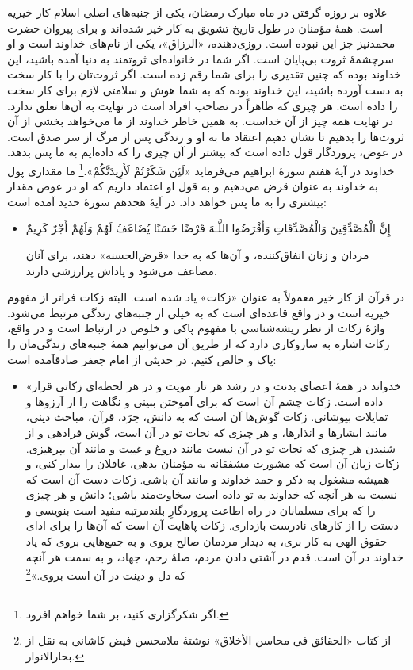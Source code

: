علاوه بر روزه گرفتن در ماه مبارک رمضان، یکی از جنبه‌های اصلی اسلام کار خیریه است. همهٔ‌ مؤمنان در طول تاریخ تشویق به کار خیر شده‌اند و برای پیروان حضرت محمد{}نیز جز این نبوده است. روزی‌دهنده، «الرزاق»، یکی از نام‌های خداوند است و  او سرچشمهٔ ثروت بی‌پایان است. اگر شما در خانواده‌ای ثروتمند به دنیا آمده باشید، این خداوند بوده که چنین تقدیری را برای شما رقم زده است. اگر ثروت‌تان را با کار سخت به دست آورده باشید، این خداوند بوده که به شما هوش و سلامتی لازم برای کار سخت را داده است. هر چیزی که ظاهراً در تصاحب افراد است در نهایت به آن‌ها تعلق ندارد. در نهایت همه چیز از آن خداست. به همین خاطر خداوند از ما می‌خواهد  بخشی از آن ثروت‌ها را بدهیم تا نشان دهیم اعتقاد ما به او و زندگی پس از مرگ از سر صدق است. در عوض، پروردگار قول داده است که بیشتر از آن چیزی را که داده‌ایم به ما پس بدهد. خداوند در آیهٔ هفتم سورهٔ ابراهیم می‌فرماید {«لَئِن شَكَرْتُمْ لَأَزِيدَنَّكُمْ».}\footnote{اگر شکرگزاری کنید، بر شما خواهم افزود.} ما مقداری پول به خداوند به عنوان قرض  می‌دهیم و به قول او اعتماد داریم که او در عوض مقدار بیشتری را به ما پس خواهد داد. در آیهٔ هجدهم سورهٔ حدید آمده است:

\begin{itemize}
	\item[]
	{
		إِنَّ الْمُصَّدِّقِينَ وَالْمُصَّدِّقَاتِ وَأَقْرَضُوا اللَّـهَ قَرْضًا حَسَنًا يُضَاعَفُ لَهُمْ وَلَهُمْ أَجْرٌ كَرِيمٌ}
	
	{
		مردان و زنان انفاق‌کننده، و آن‌ها که به خدا «قرض‌الحسنه» دهند، برای آنان مضاعف می‌شود و پاداش پرارزشی دارند.}
\end{itemize}

در قرآن از کار خیر معمولاً به عنوان «زکات» یاد شده است. البته زکات فراتر از مفهوم خیریه است و در واقع قاعده‌ای است که به خیلی از جنبه‌های زندگی مرتبط می‌شود. واژهٔ زکات از نظر ریشه‌شناسی با مفهوم پاکی و خلوص در ارتباط است و در واقع، زکات اشاره به سازوکاری دارد که از طریق آن می‌توانیم همهٔ‌ جنبه‌های زندگی‌مان را پاک و خالص کنیم.  در حدیثی از امام جعفر صادق{}آمده است:

\begin{itemize}
	\item[]
	
	{
		«خدواند در همهٔ اعضای بدنت و در رشد هر تار مویت و در هر لحظه‌ای زکاتی قرار داده است. زکات چشم آن است که برای آموختن ببینی و نگاهت را از آرزوها و تمایلات بپوشانی. زکات گوش‌ها آن است که به دانش، خِرَد، قرآن، مباحث دینی، مانند ابشارها و انذارها، و هر چیزی که نجات تو در آن است، گوش فرادهی و از شنیدن هر چیزی که نجات تو در آن نیست مانند دروغ و غیبت و مانند آن بپرهیزی. زکات زبان آن است که مشورت مشفقانه به مؤمنان بدهی، غافلان را بیدار کنی، و همیشه مشغول به ذکر و حمد خداوند و مانند آن باشی. زکات دست آن است که نسبت به هر آنچه که خداوند به تو داده است سخاوت‌مند باشی؛ دانش و هر چیزی را که برای مسلمانان در راه اطاعت پروردگارِ بلندمرتبه مفید است بنویسی و دستت را از کارهای نادرست بازداری. زکات پاهایت آن است که آن‌ها را برای ادای حقوق الهی به کار بری، به دیدار مردمان صالح بروی و به جمع‌هایی بروی که یاد خداوند در آن است. قدم در آشتی دادن مردم، صلهٔ رحم، جهاد، و به سمت هر آنچه که  دل و دینت در آن است بروی.»}\footnote{از کتاب «الحقائق فی محاسن الأخلاق» نوشتهٔ ملامحسن فیض کاشانی به نقل از بحارالانوار.}
\end{itemize}


